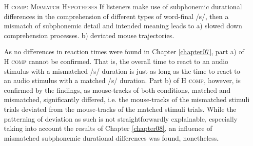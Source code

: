 \begin{description}

\item\textsc{H comp}: \textsc{Mismatch Hypotheses} \newline
If listeners make use of subphonemic durational differences in the comprehension of different types of word-final /s/, then a mismatch of subphonemic detail and intended meaning leads to\newline
a) slowed down comprehension processes.\newline
b) deviated mouse trajectories.

\end{description}

As no differences in reaction times were found in Chapter \ref{chapter07}, part a) of \textsc{H comp} cannot be confirmed. That is, the overall time to react to an audio stimulus with a mismatched /s/ duration is just as long as the time to react to an audio stimulus with a matched /s/ duration. Part b) of \textsc{H comp}, however, is confirmed by the findings, as mouse-tracks of both conditions, matched and mismatched, significantly differed, i.e. the mouse-tracks of the mismatched stimuli trials deviated from the mouse-tracks of the matched stimuli trials. While the patterning of deviation as such is not straightforwardly explainable, especially taking into account the results of Chapter \ref{chapter08}, an influence of mismatched subphonemic durational differences was found, nonetheless.

